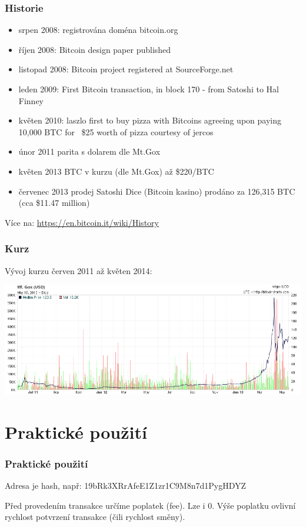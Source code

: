 \documentclass[xetex]{beamer}
\begin{document}
\begin{frame}
  \frametitle{Historie}
        \begin{itemize}
                \item srpen 2008: registrována doména bitcoin.org
                \item říjen 2008: Bitcoin design paper published
                \item listopad 2008: Bitcoin project registered at SourceForge.net
                \item leden 2009: First Bitcoin transaction, in block 170 - from Satoshi to Hal Finney
                \item květen 2010: laszlo first to buy pizza with Bitcoins agreeing upon paying 10,000 BTC for ~\$25 worth of pizza courtesy of jercos
		\item únor 2011 parita s dolarem dle Mt.Gox
		\item květen 2013 BTC v kurzu (dle Mt.Gox) až \$220/BTC
		\item červenec 2013 prodej Satoshi Dice (Bitcoin kasino) prodáno za 126,315 BTC (cca \$11.47 million)
	\end{itemize}

        Více na: \url{https://en.bitcoin.it/wiki/History}
\end{frame}

\begin{frame}
        \frametitle{Kurz}
        Vývoj kurzu červen 2011 až květen 2014:

        \includegraphics[scale=0.35]{images/bitcoin-exchange-rate.png}
\end{frame}


\section{Praktické použití}

\begin{frame}
	\frametitle{Praktické použití}
	Adresa je hash, např: 19bRk3XRrAfeE1Z1zr1C9M8n7d1PygHDYZ

	\bigskip

	Před provedením transakce určíme poplatek (fee). Lze i 0. Výše poplatku ovlivní rychlost potvrzení transakce (čili rychlost směny). 
\end{frame}
\end{document}

